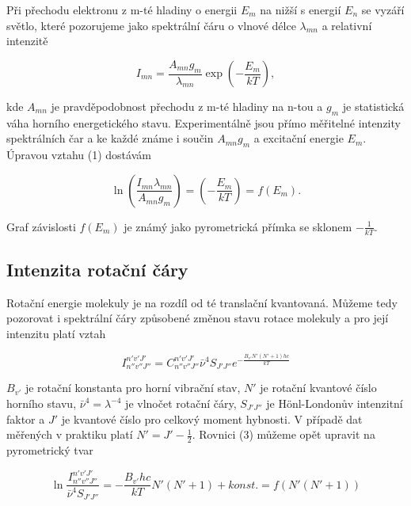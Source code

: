\documentclass[a4paper,11pt]{article}
\begin{document}
Při přechodu elektronu z m-té hladiny o energii \( E_m \) na nižší s energií \( E_n \) se vyzáří světlo, které pozorujeme jako spektrální čáru o vlnové délce \( \lambda_{mn} \) a relativní intenzitě

\begin{equation}
    I_{mn} =  \frac{A_{mn}g_m}{\lambda_{mn}} \exp \left( -\frac{E_m}{kT} \right),
\end{equation}

\noindent
kde $ A_{mn} $  je pravděpodobnost přechodu z m-té hladiny na n-tou a $ g_m $  je statistická váha horního energetického stavu. Experimentálně jsou přímo měřitelné intenzity spektrálních čar a ke každé známe i součin $ A_{mn} g_m $ a excitační energie $ E_m $. Úpravou vztahu (1) dostávám

\begin{equation}
\ln \left( \frac{I_{mn}\lambda_{mn}}{A_{mn}g_m} \right) = \left( - \frac{E_m}{kT} \right) = f(E_m).
\end{equation}

Graf závislosti $ f(E_m) $ je známý jako pyrometrická přímka se sklonem $ - \frac{1}{kT} $.

\subsection{Intenzita rotační čáry}

Rotační energie molekuly je na rozdíl od té translační kvantovaná. Můžeme tedy pozorovat i spektrální čáry způsobené změnou stavu rotace molekuly a pro její intenzitu platí vztah

\begin{equation}
I_{n''v''J''}^{n'v'J'} = C_{n''v''J''}^{n'v'J'} \bar{\nu}^{4} S_{J'J''}e^{-\frac{B_{v'} N' (N' + 1) hc}{kT}}
\end{equation}

\noindent
$ B_{v'} $  je rotační konstanta pro horní vibrační stav, $ N' $  je rotační kvantové číslo horního stavu, $ \bar{\nu}^{4} = \lambda^{-4} $ je vlnočet rotační čáry, $ S_{J'J''} $ je Hönl-Londonův intenzitní faktor a $ J' $ je kvantové číslo pro celkový moment hybnosti. V případě dat měřených v praktiku platí $ N' = J' - \frac{1}{2} $. Rovnici (3) můžeme opět upravit na pyrometrický tvar

\begin{equation}
\ln \frac{I_{n''v''J''}^{n'v'J'}}{\bar{\nu}^{4} S_{J'J''}} = -\frac{B_{v'} hc}{kT} N' (N' + 1)  + konst. = f(N' (N' + 1))
\end{equation}
\end{document}
